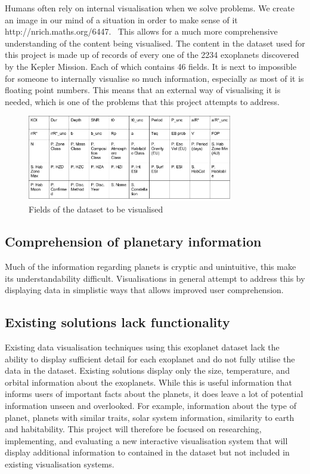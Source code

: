 Humans often rely on internal visualisation when we solve problems. We create an image in our mind of a situation in order to make sense of it http://nrich.maths.org/6447.~ This allows for a much more comprehensive understanding of the content being visualised. The content in the dataset used for this project is made up of records of every one of the 2234 exoplanets discovered by the Kepler Mission. Each of which contains 46 fields. It is next to impossible for someone to internally visualise so much information, especially as most of it is floating point numbers. This means that an external way of visualising it is needed, which is one of the problems that this project attempts to address. 
\begin{figure}[h!]
  \centering
      \includegraphics[width=0.8\textwidth]{images/data.png}
  \caption{Fields of the dataset to be visualised}
\end{figure}

\subsection{Comprehension of planetary information}
Much of the information regarding planets is cryptic and unintuitive, this make its understandability difficult. Visualisations in general attempt to address this by displaying data in simplistic ways that allows improved user comprehension.

\subsection{Existing solutions lack functionality}
Existing data visualisation techniques using this exoplanet dataset lack the ability to display sufficient detail for each exoplanet and do not fully utilise the data in the dataset. Existing solutions display only the size, temperature, and orbital information about the exoplanets. While this is useful information that informs users of important facts about the planets, it does leave a lot of potential information unseen and overlooked. For example, information about the type of planet, planets with similar traits, solar system information, similarity to earth and habitability. This project will therefore be focused on researching, implementing, and evaluating a new interactive visualisation system that will display additional information to contained in the dataset but not included in existing visualisation systems.

